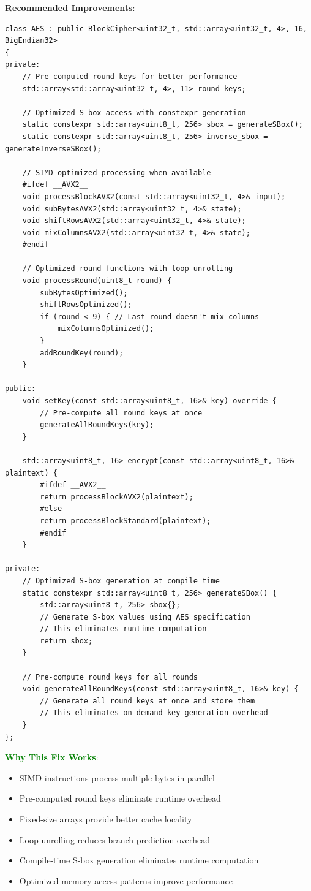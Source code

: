 \documentclass[11pt,a4paper]{article}
\begin{document}
\textbf{Recommended Improvements}:
\begin{lstlisting}
class AES : public BlockCipher<uint32_t, std::array<uint32_t, 4>, 16, BigEndian32>
{
private:
    // Pre-computed round keys for better performance
    std::array<std::array<uint32_t, 4>, 11> round_keys;
    
    // Optimized S-box access with constexpr generation
    static constexpr std::array<uint8_t, 256> sbox = generateSBox();
    static constexpr std::array<uint8_t, 256> inverse_sbox = generateInverseSBox();
    
    // SIMD-optimized processing when available
    #ifdef __AVX2__
    void processBlockAVX2(const std::array<uint32_t, 4>& input);
    void subBytesAVX2(std::array<uint32_t, 4>& state);
    void shiftRowsAVX2(std::array<uint32_t, 4>& state);
    void mixColumnsAVX2(std::array<uint32_t, 4>& state);
    #endif
    
    // Optimized round functions with loop unrolling
    void processRound(uint8_t round) {
        subBytesOptimized();
        shiftRowsOptimized();
        if (round < 9) { // Last round doesn't mix columns
            mixColumnsOptimized();
        }
        addRoundKey(round);
    }
    
public:
    void setKey(const std::array<uint8_t, 16>& key) override {
        // Pre-compute all round keys at once
        generateAllRoundKeys(key);
    }
    
    std::array<uint8_t, 16> encrypt(const std::array<uint8_t, 16>& plaintext) {
        #ifdef __AVX2__
        return processBlockAVX2(plaintext);
        #else
        return processBlockStandard(plaintext);
        #endif
    }
    
private:
    // Optimized S-box generation at compile time
    static constexpr std::array<uint8_t, 256> generateSBox() {
        std::array<uint8_t, 256> sbox{};
        // Generate S-box values using AES specification
        // This eliminates runtime computation
        return sbox;
    }
    
    // Pre-compute round keys for all rounds
    void generateAllRoundKeys(const std::array<uint8_t, 16>& key) {
        // Generate all round keys at once and store them
        // This eliminates on-demand key generation overhead
    }
};
\end{lstlisting}

\textcolor{green}{\textbf{Why This Fix Works}}:
\begin{itemize}
    \item SIMD instructions process multiple bytes in parallel
    \item Pre-computed round keys eliminate runtime overhead
    \item Fixed-size arrays provide better cache locality
    \item Loop unrolling reduces branch prediction overhead
    \item Compile-time S-box generation eliminates runtime computation
    \item Optimized memory access patterns improve performance
\end{itemize}
\end{document}
